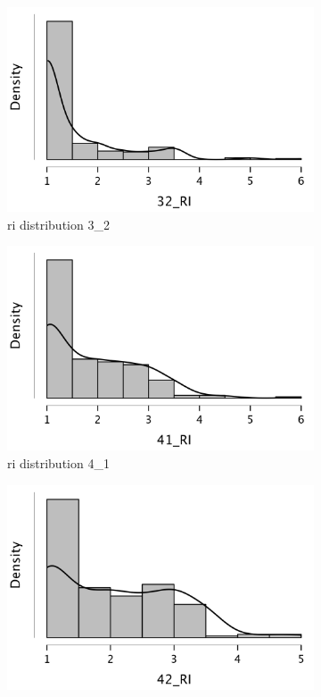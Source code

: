 \documentclass[
  a4paper,  %
  twoside,  %
  bibliography=totoc,
  headsepline,
  cleardoublepage=empty,
  parskip=half,
  draft=false
]{scrbook}
\begin{document}
\begin{figure}[h]
\begin{subfigure}{0.3\textwidth}
    \includegraphics[width=\linewidth]{graphics/images/statistics/RIs/32_RI.png}
    \caption{\gls{ri} distribution 3\_2}
    \label{fig:RI32}
  \end{subfigure}
  \begin{subfigure}{0.3\textwidth}
    \includegraphics[width=\linewidth]{graphics/images/statistics/RIs/41_RI.png}
    \caption{\gls{ri} distribution 4\_1}
    \label{fig:RI41}
  \end{subfigure}
  \begin{subfigure}{0.3\textwidth}
    \includegraphics[width=\linewidth]{graphics/images/statistics/RIs/42_RI.png}

\end{subfigure}
\end{figure}
\end{document}
